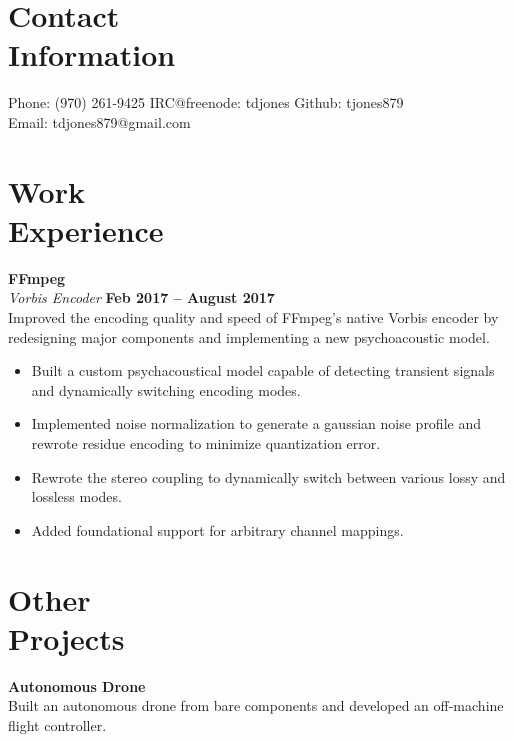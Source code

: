 \documentclass[margin,line]{resume}
\begin{document}
\begin{resume}
    \section{\mysidestyle Contact\\Information}

    Phone: (970) 261-9425 \hfill IRC@freenode: tdjones \hfill Github: tjones879 \\
    \noindent Email: tdjones879@gmail.com  \hfill \vspace{0mm}\\\vspace{-4.5mm}

    \section{\mysidestyle Work\\Experience}

    \textbf{FFmpeg} \vspace{2mm}\\\vspace{1mm}%
    \textsl{Vorbis Encoder} \hfill \textbf{Feb 2017 -- August 2017}\\
    Improved the encoding quality and speed of FFmpeg's native Vorbis
    encoder by redesigning major components and implementing a new
    psychoacoustic model.

	\begin{itemize}
	\item Built a custom psychacoustical model capable of detecting
              transient signals and dynamically switching encoding modes.
	\item Implemented noise normalization to generate a gaussian noise
	      profile and rewrote residue encoding to minimize quantization
	      error.
	\item Rewrote the stereo coupling to dynamically switch between
	      various lossy and lossless modes.
	\item Added foundational support for arbitrary channel mappings.
	\end{itemize}

    \section{\mysidestyle Other\\Projects}

    \textbf{Autonomous Drone}\\
    Built an autonomous drone from bare components and developed an
    off-machine flight controller.


\end{resume}
\end{document}
